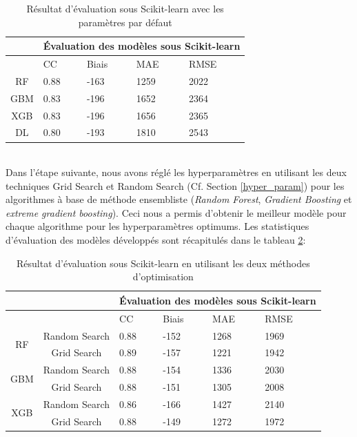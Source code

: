 \begin{table}[!ht]
    \centering
    \begin{tabular}{ |c|p{2cm}|p{2cm}|p{2cm}|p{2cm}|  }
     \hline
     & \multicolumn{4}{|c|}{Évaluation des modèles sous Scikit-learn} \\
     \hline
     & CC & Biais & MAE & RMSE\\
     \hline
     RF & 0.88 & -163 &  1259 & 2022\\
     \hline
     GBM &  0.83 & -196 & 1652 & 2364 \\
     \hline
     XGB & 0.83 & -196 & 1656 & 2365\\
     \hline
     DL & 0.80 & -193 & 1810 & 2543 \\
     \hline
    \end{tabular}
    \caption{Résultat d'évaluation sous Scikit-learn avec les paramètres par défaut}
    \label{sc_default}
\end{table}
\\

Dans l'étape suivante, nous avons réglé les hyperparamètres en utilisant les deux techniques Grid Search et Random Search (Cf. Section \ref{hyper_param}) pour les algorithmes à base de méthode ensembliste (\textit{Random Forest}, \textit{Gradient Boosting} et \textit{extreme gradient boosting}). Ceci nous a permis d'obtenir le meilleur modèle pour chaque algorithme pour les hyperparamètres optimums. Les statistiques d'évaluation des modèles développés sont récapitulés dans le tableau \ref{sc_ev_Tuning}:\\

\begin{table}[!ht]
    \centering
    \begin{tabular}{ |c|c|p{2cm}|p{2cm}|p{2cm}|p{2cm}|  }
     \hline
     \multicolumn{2}{|c|}{} &\multicolumn{4}{|c|}{Évaluation des modèles sous Scikit-learn} \\
     \hline
     \multicolumn{2}{|c|}{} & CC & Biais & MAE & RMSE\\
     \hline
    \multirow{2}{*}{RF} &
     Random Search & 0.88 & -152 &  1268 & 1969\\
     & Grid Search & 0.89 & -157 & 1221 & 1942\\
     \hline
     \multirow{2}{*}{GBM} &
     Random Search & 0.88 & -154 & 1336 & 2030\\
     & Grid Search & 0.88 & -151 & 1305 & 2008\\
     \hline
     \multirow{2}{*}{XGB} &
     Random Search & 0.86 & -166 & 1427 & 2140\\
     & Grid Search & 0.88 & -149 & 1272 & 1972\\
     \hline
    \end{tabular}
    \caption{Résultat d'évaluation sous Scikit-learn en utilisant les deux méthodes d'optimisation}
    \label{sc_ev_Tuning}
\end{table}


